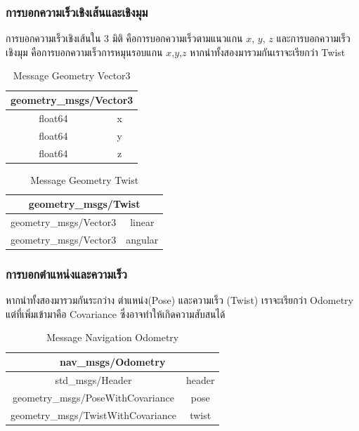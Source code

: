 \subsubsection*{การบอกความเร็วเชิงเส้นและเชิงมุม}
การบอกความเร็วเชิงเส้นใน 3 มิติ คือการบอกความเร็วตามแนวแกน $x$, $y$, $z$ และการบอกความเร็วเชิงมุม
คือการบอกความเร็วการหมุนรอบแกน $x$,$y$,$z$ หากนำทั้งสองมารวมกันเราจะเรียกว่า Twist
\begin{table}[!ht]
	\centering
	\begin{tabular}{| c | c |}
		\hline
		\multicolumn{2}{|c|}{geometry\_msgs/Vector3}\\
		\hline
		float64 & x \\
		float64 & y \\
		float64 & z \\
		\hline
	\end{tabular}
	\caption{Message Geometry Vector3}
	\label{tab:geometry_vector3}
\end{table}
\begin{table}[!ht]
	\centering
	\begin{tabular}{| c | c |}
		\hline
		\multicolumn{2}{|c|}{geometry\_msgs/Twist}\\
		\hline
		geometry\_msgs/Vector3 & linear \\
		geometry\_msgs/Vector3 & angular \\
		\hline
	\end{tabular}
	\caption{Message Geometry Twist}
	\label{tab:geometry_twist}
\end{table}

\subsubsection*{การบอกตำแหน่งและความเร็ว}
หากนำทั้งสองมารวมกันระกว่าง ตำแหน่ง(Pose) และความเร็ว (Twist) เราจะเรียกว่า Odometry
แต่ที่เพิ่มเข้ามาคือ Covariance ซึ่งอาจทำให้เกิดความสับสนได้
\begin{table}[!ht]
	\centering
	\begin{tabular}{| c | c |}
		\hline
		\multicolumn{2}{|c|}{nav\_msgs/Odometry}\\
		\hline
		std\_msgs/Header & header \\
		geometry\_msgs/PoseWithCovariance & pose \\
		geometry\_msgs/TwistWithCovariance & twist \\
		\hline
	\end{tabular}
	\caption{Message Navigation Odometry}
	\label{tab:nav_odometry}
\end{table}

